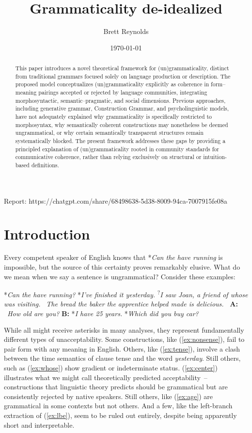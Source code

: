 \documentclass[12pt,letterpaper]{article}
\title{Grammaticality de-idealized}
\author{Brett Reynolds}
\date{\today}
\begin{document}
\maketitle

\begin{abstract}
    This paper introduces a novel theoretical framework for (un)gram\-maticality, distinct from traditional grammars focused solely on language production or description. The proposed model conceptualizes (un)grammaticality explicitly as coherence in form–meaning pairings accepted or rejected by language communities, integrating morphosyntactic, semantic–pragmatic, and social dimensions. Previous approaches, including generative grammar, Construction Grammar, and psycholinguistic models, have not adequately explained why grammaticality is specifically restricted to morphosyntax, why semantically coherent constructions may nonetheless be deemed ungrammatical, or why certain semantically transparent structures remain systematically blocked. The present framework addresses these gaps by providing a principled explanation of (un)grammaticality rooted in community standards for communicative coherence, rather than relying exclusively on structural or intuition-based definitions.
\end{abstract}

Report: https://chatgpt.com/share/68498638-5d38-8009-94ca-7007915fe08a

\newpage
\section*{Introduction}

Every competent speaker of English knows that *\textit{Can the have running} is impossible, but the source of this certainty proves remarkably elusive. What do we mean when we say a sentence is ungrammatical? Consider these examples:

\ea \label{ex:starting-stars}
\ea\label{ex:nonsense} *\textit{Can the have running?}
\ex\label{ex:tense} *\textit{I've finished it yesterday.}
\ex\textsuperscript{?}\textit{I saw Joan, a friend of whose was visiting.}\label{ex:whose} 
\ex\label{ex:center} \textit{~The bread the baker the apprentice helped made is delicious.}
\ex\label{ex:age} \textbf{~A:} \textit{~How old are you?} \textbf{B:} *\textit{I have 25 years.}
\ex\label{ex:lbe} *\textit{Which did you buy car?}
\z\z

While all might receive asterisks in many analyses, they represent fundamentally different types of unacceptability. Some constructions, like (\ref{ex:nonsense}), fail to pair form with any meaning in English. Others, like (\ref{ex:tense}), involve a clash between the time semantics of clause tense and the word \textit{yesterday}. Still others, such as (\ref{ex:whose}) show gradient or indeterminate status. (\ref{ex:center}) illustrates what we might call theoretically predicted acceptability~-- constructions that linguistic theory predicts should be grammatical but are consistently rejected by native speakers. Still others, like (\ref{ex:age}) are grammatical in some contexts but not others. And a few, like the left-branch extraction of (\ref{ex:lbe}), seem to be ruled out entirely, despite being apparently short and interpretable.
\end{document}
